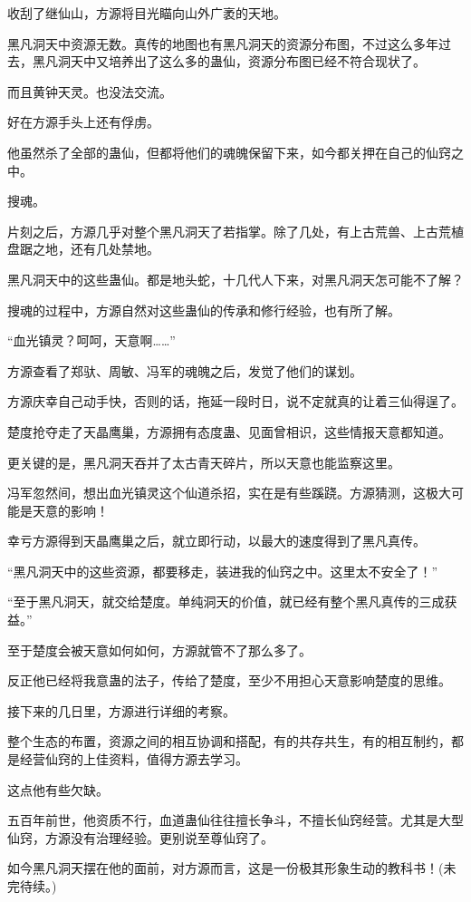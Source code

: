 \begin{this_body}
收刮了继仙山，方源将目光瞄向山外广袤的天地。

黑凡洞天中资源无数。真传的地图也有黑凡洞天的资源分布图，不过这么多年过去，黑凡洞天中又培养出了这么多的蛊仙，资源分布图已经不符合现状了。

而且黄钟天灵。也没法交流。

好在方源手头上还有俘虏。

他虽然杀了全部的蛊仙，但都将他们的魂魄保留下来，如今都关押在自己的仙窍之中。

搜魂。

片刻之后，方源几乎对整个黑凡洞天了若指掌。除了几处，有上古荒兽、上古荒植盘踞之地，还有几处禁地。

黑凡洞天中的这些蛊仙。都是地头蛇，十几代人下来，对黑凡洞天怎可能不了解？

搜魂的过程中，方源自然对这些蛊仙的传承和修行经验，也有所了解。

“血光镇灵？呵呵，天意啊……”

方源查看了郑驮、周敏、冯军的魂魄之后，发觉了他们的谋划。

方源庆幸自己动手快，否则的话，拖延一段时日，说不定就真的让着三仙得逞了。

楚度抢夺走了天晶鹰巢，方源拥有态度蛊、见面曾相识，这些情报天意都知道。

更关键的是，黑凡洞天吞并了太古青天碎片，所以天意也能监察这里。

冯军忽然间，想出血光镇灵这个仙道杀招，实在是有些蹊跷。方源猜测，这极大可能是天意的影响！

幸亏方源得到天晶鹰巢之后，就立即行动，以最大的速度得到了黑凡真传。

“黑凡洞天中的这些资源，都要移走，装进我的仙窍之中。这里太不安全了！”

“至于黑凡洞天，就交给楚度。单纯洞天的价值，就已经有整个黑凡真传的三成获益。”

至于楚度会被天意如何如何，方源就管不了那么多了。

反正他已经将我意蛊的法子，传给了楚度，至少不用担心天意影响楚度的思维。

接下来的几日里，方源进行详细的考察。

整个生态的布置，资源之间的相互协调和搭配，有的共存共生，有的相互制约，都是经营仙窍的上佳资料，值得方源去学习。

这点他有些欠缺。

五百年前世，他资质不行，血道蛊仙往往擅长争斗，不擅长仙窍经营。尤其是大型仙窍，方源没有治理经验。更别说至尊仙窍了。

如今黑凡洞天摆在他的面前，对方源而言，这是一份极其形象生动的教科书！(未完待续。)

\end{this_body}

